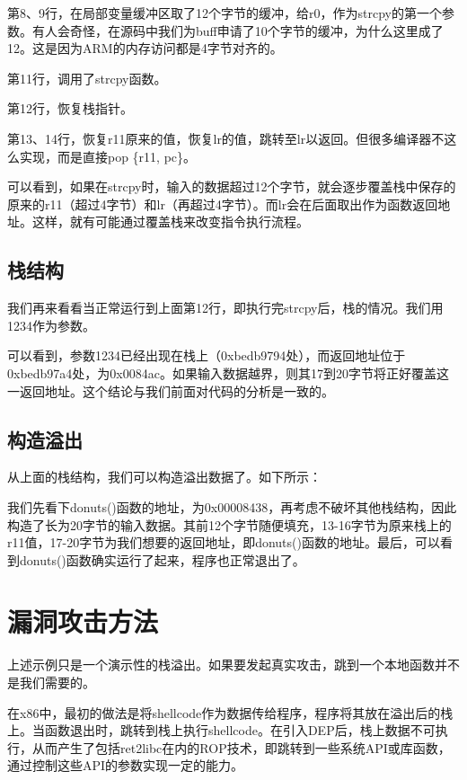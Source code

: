 第8、9行，在局部变量缓冲区取了12个字节的缓冲，给r0，作为strcpy的第一个参数。有人会奇怪，在源码中我们为buff申请了10个字节的缓冲，为什么这里成了12。这是因为ARM的内存访问都是4字节对齐的。

第11行，调用了strcpy函数。

第12行，恢复栈指针。

第13、14行，恢复r11原来的值，恢复lr的值，跳转至lr以返回。但很多编译器不这么实现，而是直接pop \{r11, pc\}。

可以看到，如果在strcpy时，输入的数据超过12个字节，就会逐步覆盖栈中保存的原来的r11（超过4字节）和lr（再超过4字节）。而lr会在后面取出作为函数返回地址。这样，就有可能通过覆盖栈来改变指令执行流程。

\subsection{栈结构}
我们再来看看当正常运行到上面第12行，即执行完strcpy后，栈的情况。我们用1234作为参数。



可以看到，参数1234已经出现在栈上（0xbedb9794处），而返回地址位于0xbedb97a4处，为0x0084ac。如果输入数据越界，则其17到20字节将正好覆盖这一返回地址。这个结论与我们前面对代码的分析是一致的。

\subsection{构造溢出}
从上面的栈结构，我们可以构造溢出数据了。如下所示：



我们先看下donuts()函数的地址，为0x00008438，再考虑不破坏其他栈结构，因此构造了长为20字节的输入数据。其前12个字节随便填充，13-16字节为原来栈上的r11值，17-20字节为我们想要的返回地址，即donuts()函数的地址。最后，可以看到donuts()函数确实运行了起来，程序也正常退出了。

\section{漏洞攻击方法}
上述示例只是一个演示性的栈溢出。如果要发起真实攻击，跳到一个本地函数并不是我们需要的。

在x86中，最初的做法是将shellcode作为数据传给程序，程序将其放在溢出后的栈上。当函数退出时，跳转到栈上执行shellcode。在引入DEP后，栈上数据不可执行，从而产生了包括ret2libc在内的ROP技术，即跳转到一些系统API或库函数，通过控制这些API的参数实现一定的能力。

